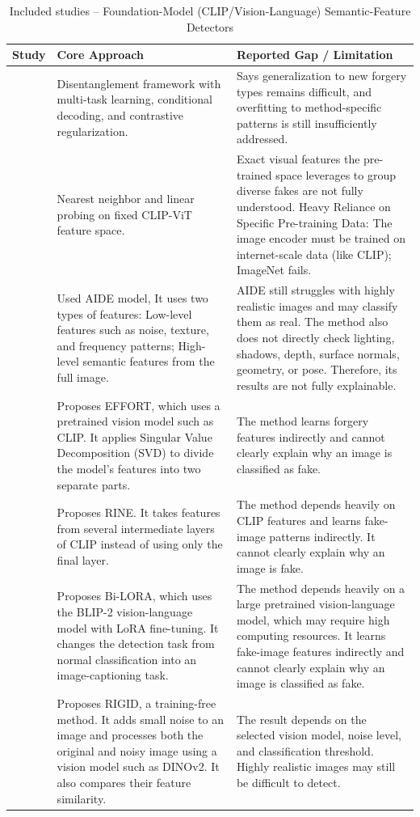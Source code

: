 \documentclass[sn-mathphys-num,Numbered,pdflatex]{sn-jnl}
\begin{document}
\begin{table}[htbp]
\caption{Included studies -- Foundation-Model (CLIP/Vision-Language) Semantic-Feature Detectors}
\label{tab:foundation_semantic}
\centering\footnotesize
\begin{tabularx}{\columnwidth}{@{}p{} X X@{}}
\toprule
\textbf{Study} & \textbf{Core Approach} & \textbf{Reported Gap / Limitation} \\
\midrule
\cite{UcfUncovering16} & Disentanglement framework with multi-task learning, conditional decoding, and contrastive regularization. & Says generalization to new forgery types remains difficult, and overfitting to method-specific patterns is still insufficiently addressed. \\
\cite{TowardsUniversal19} & Nearest neighbor and linear probing on fixed CLIP-ViT feature space. & Exact visual features the pre-trained space leverages to group diverse fakes are not fully understood. Heavy Reliance on Specific Pre-training Data: The image encoder must be trained on internet-scale data (like CLIP); ImageNet fails. \\
\cite{ASanity21} & Used AIDE model, It uses two types of features: Low-level features such as noise, texture, and frequency patterns; High-level semantic features from the full image. & AIDE still struggles with highly realistic images and may classify them as real. The method also does not directly check lighting, shadows, depth, surface normals, geometry, or pose. Therefore, its results are not fully explainable. \\
\cite{OrthogonalSubspace22} & Proposes EFFORT, which uses a pretrained vision model such as CLIP. It applies Singular Value Decomposition (SVD) to divide the model's features into two separate parts. & The method learns forgery features indirectly and cannot clearly explain why an image is classified as fake. \\
\cite{LeveragingRepresentations23} & Proposes RINE. It takes features from several intermediate layers of CLIP instead of using only the final layer. & The method depends heavily on CLIP features and learns fake-image patterns indirectly. It cannot clearly explain why an image is fake. \\
\cite{BiloraA25} & Proposes Bi-LORA, which uses the BLIP-2 vision-language model with LoRA fine-tuning. It changes the detection task from normal classification into an image-captioning task. & The method depends heavily on a large pretrained vision-language model, which may require high computing resources. It learns fake-image features indirectly and cannot clearly explain why an image is classified as fake. \\
\cite{RigidA30} & Proposes RIGID, a training-free method. It adds small noise to an image and processes both the original and noisy image using a vision model such as DINOv2. It also compares their feature similarity. & The result depends on the selected vision model, noise level, and classification threshold. Highly realistic images may still be difficult to detect. \\
\bottomrule
\end{tabularx}
\end{table}
\FloatBarrier
\end{document}
